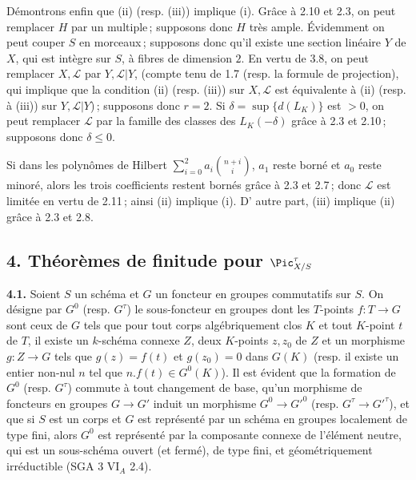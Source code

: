 D\'emontrons enfin que (ii) (resp. (iii)) implique (i). Gr\^ace \`a 2.10 et 2.3, on peut remplacer \(H\) par un multiple\,; supposons donc \(H\) tr\`es ample. \'Evidemment on peut couper \(S\) en morceaux\,; supposons donc qu'il existe une section lin\'eaire \(Y\) de \(X\), qui est int\`egre sur \(S\), \`a fibres de dimension \(2\). En vertu de 3.8, on peut remplacer \(X,\mathcal L\) par \(Y,\mathcal L|Y\), (compte tenu de 1.7 (resp. la formule de projection), qui implique que la condition (ii) (resp. (iii)) sur \(X,\mathcal L\) est \'equivalente \`a (ii) (resp. \`a (iii)) sur \(Y,\mathcal L|Y\))\,; supposons donc \(r=2\). Si \(\delta=\sup\{d(L_K)\}\) est \(>0\), on peut remplacer \(\mathcal L\) par la famille des classes des \(L_K(-\delta)\) gr\^ace \`a 2.3 et 2.10\,; supposons donc \(\delta\le0\).

Si dans les polyn\^omes de Hilbert \(\sum_{i=0}^{2}a_i\binom{n+i}{i}\), \(a_1\) reste born\'e et \(a_0\) reste minor\'e, alors les trois coefficients restent born\'es gr\^ace \`a 2.3 et 2.7\,; donc \(\mathcal L\) est limit\'ee en vertu de 2.11\,; ainsi (ii) implique (i). D'%
autre part, (iii) implique (ii) gr\^ace \`a 2.3 et 2.8.

\subsection*{4. Th\'eor\`emes de finitude pour $\Pic^\tau_{X/S}$}

\textbf{4.1.} Soient \(S\) un sch\'ema et \(G\) un foncteur en groupes commutatifs sur \(S\). On d\'esigne par \(G^0\) (resp. \(G^\tau\)) le sous-foncteur en groupes dont les \(T\)-points \(f:T\to G\) sont ceux de \(G\) tels que pour tout corps alg\'ebriquement clos \(K\) et tout \(K\)-point \(t\) de \(T\), il existe un \(k\)-sch\'ema connexe \(Z\), deux \(K\)-points \(z,z_0\) de \(Z\) et un morphisme \(g:Z\to G\) tels que \(g(z)=f(t)\) et \(g(z_0)=0\) dans \(G(K)\) (resp. il existe un entier non-nul \(n\) tel que \(n.f(t)\in G^0(K)\)). Il est \'evident que la formation de \(G^0\) (resp. \(G^\tau\)) commute \`a tout changement de base, qu'un morphisme de foncteurs en groupes \(G\to G'\) induit un morphisme \(G^0\to G'^0\) (resp. \(G^\tau\to G'^\tau\)), et que si \(S\) est un corps et \(G\) est repr\'esent\'e par un sch\'ema en groupes localement de type fini, alors \(G^0\) est repr\'esent\'e par la composante connexe de l'\'el\'ement neutre, qui est un sous-sch\'ema ouvert (et ferm\'e), de type fini, et g\'eom\'etriquement irr\'eductible (SGA 3 VI\(_A\) 2.4).

